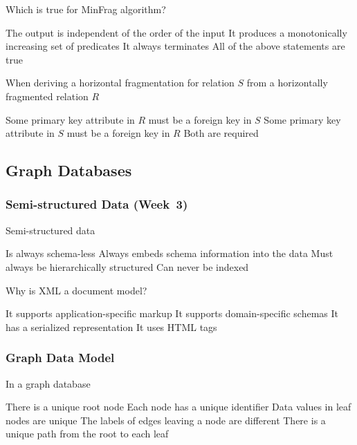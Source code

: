 \documentclass[12pt,a4paper,answers]{exam} %
\begin{document}
\begin{flushleft}
\begin{multicols*}{2}
\begin{questions}
\question Which is true for MinFrag algorithm?
\begin{checkboxes}
\choice The output is independent of the order of the input
\choice It produces a monotonically increasing set of predicates
\CorrectChoice It always terminates
\choice All of the above statements are true
\end{checkboxes}


\question When deriving a horizontal fragmentation for relation $S$ from a horizontally fragmented relation $R$
\begin{checkboxes}
\CorrectChoice Some primary key attribute in $R$ must be a foreign key in $S$
\choice Some primary key attribute in $S$ must be a foreign key in $R$
\choice Both are required
\end{checkboxes}



\subsection{Graph Databases} %
\subsubsection{Semi-structured Data (Week~3)}

\question Semi-structured data
\begin{checkboxes}
\choice Is always schema-less
\CorrectChoice Always embeds schema information into the data
\choice Must always be hierarchically structured
\choice Can never be indexed
\end{checkboxes}

\question Why is XML a document model?
\begin{checkboxes}
\choice It supports application-specific markup
\choice It supports domain-specific schemas
\CorrectChoice It has a serialized representation
\choice It uses HTML tags
\end{checkboxes}


\subsubsection{Graph Data Model}

\question In a graph database
\begin{checkboxes}
\choice There is a unique root node
\CorrectChoice Each node has a unique identifier
\choice Data values in leaf nodes are unique
\choice The labels of edges leaving a node are different
\choice There is a unique path from the root to each leaf
\end{checkboxes}


\end{questions}
\end{multicols*}
\end{flushleft}
\end{document}
